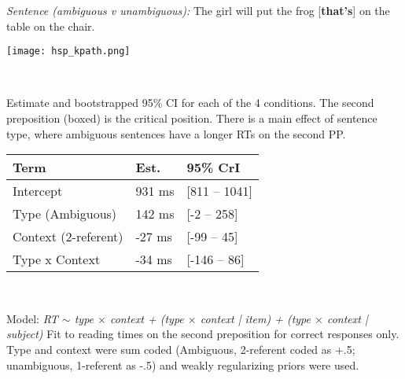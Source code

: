 \documentclass[11pt,a4paper]{article}
\begin{document}
\begin{minipage}{\textwidth}
	\begin{small}
	\textit{Sentence (ambiguous v unambiguous):} The girl will put the frog [\textbf{that's}] on the table on the chair.
	\end{small}
	
\end{minipage}

\vspace{10pt}
	\begin{minipage}{.65\textwidth}
		{	\texttt{[image: hsp\_kpath.png]}} 
	
	\end{minipage}
	~~~
	\begin{minipage}{.3\textwidth}		\begin{small}

			Estimate and bootstrapped 95\% CI for each of the 4 conditions. The second preposition (boxed) is the critical position. There is a main effect of sentence type, where ambiguous sentences have a longer RTs on the second PP. 
			
		\end{small}
		\end{minipage}
		
		\begin{minipage}{.48\textwidth}
	\begin{small}
	\begin{tabular}{|l|l|l|}
		\hline
		Term & Est. & 95\% CrI \\
		\hline
		Intercept & 931 ms & [811 -- 1041] \\
		Type (Ambiguous) & 142 ms & [-2 -- 258] \\
		Context (2-referent) & -27 ms & [-99 -- 45] \\
		Type x Context & -34 ms  & [-146 -- 86] \\
		\hline
	\end{tabular}
\end{small}
	\end{minipage}
	~~
	\begin{minipage} {.5\textwidth}\begin{small}
	Model: \textit{RT $\sim$ type $\times$ context + (type $\times$ context | item) + (type $\times$ context | subject)}
	Fit to reading times on the second preposition for correct responses only. Type and context were sum coded (Ambiguous, 2-referent coded as +.5; unambiguous, 1-referent as -.5) and weakly regularizing priors were used. 
\end{small}
	\end{minipage}
\end{document}
